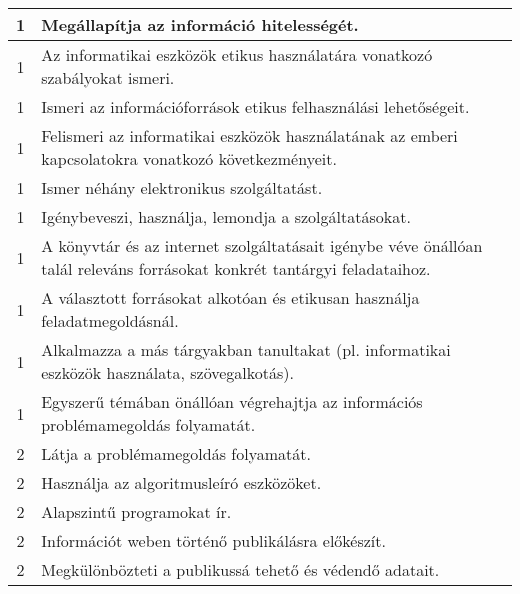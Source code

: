 \begin{longtable}{c | p{} }
                                          1 &  Megállapítja az információ hitelességét. \\ \hline
                                          1 &  Az informatikai eszközök etikus használatára vonatkozó szabályokat ismeri. \\ \hline
                                          1 &  Ismeri az információforrások etikus felhasználási lehetőségeit. \\ \hline
                                          1 &  Felismeri az informatikai eszközök használatának az emberi kapcsolatokra vonatkozó következményeit. \\ \hline
                                          1 &  Ismer néhány elektronikus szolgáltatást. \\ \hline
                                          1 &  Igénybeveszi, használja, lemondja a szolgáltatásokat. \\ \hline
                                          1 &  A könyvtár és az internet szolgáltatásait igénybe véve önállóan talál releváns forrásokat konkrét tantárgyi feladataihoz. \\ \hline
                                          1 &  A választott forrásokat alkotóan és etikusan használja feladatmegoldásnál. \\ \hline
                                          1 &  Alkalmazza a más tárgyakban tanultakat (pl. informatikai eszközök használata, szövegalkotás). \\ \hline
                                          1 &  Egyszerű témában önállóan végrehajtja az információs problémamegoldás folyamatát. \\ \hline
                                      
                                
                                          2 &  Látja a problémamegoldás folyamatát. \\ \hline
                                          2 &  Használja az algoritmusleíró eszközöket. \\ \hline
                                          2 &  Alapszintű programokat ír. \\ \hline
                                          2 &  Információt weben történő publikálásra előkészít. \\ \hline
                                          2 &  Megkülönbözteti a publikussá tehető és védendő adatait. \\ \hline
                                      

\end{longtable}
